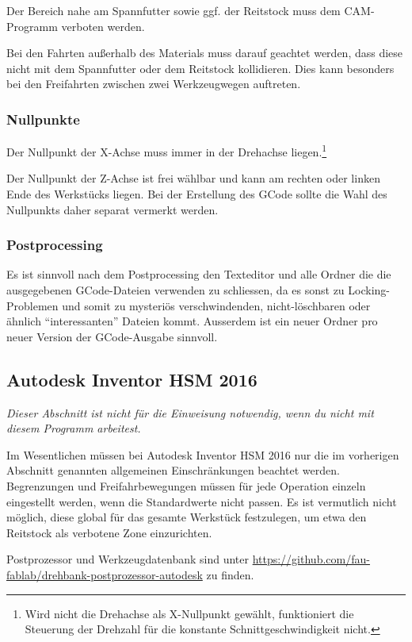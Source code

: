 \documentclass{\basedir/fablab-document}
\begin{document}
Der Bereich nahe am Spannfutter sowie ggf. der Reitstock muss dem CAM-Programm verboten werden.

Bei den Fahrten außerhalb des Materials muss darauf geachtet werden, dass diese nicht mit dem Spannfutter oder dem Reitstock kollidieren. Dies kann besonders bei den Freifahrten zwischen zwei Werkzeugwegen auftreten.

\subsubsection{Nullpunkte} \label{sec:cnc-erstellung.allg.nullpunkte}
Der Nullpunkt der X-Achse muss immer in der Drehachse liegen.\footnote{Wird nicht die Drehachse als X-Nullpunkt gewählt, funktioniert die Steuerung der Drehzahl für die konstante Schnittgeschwindigkeit nicht.}

Der Nullpunkt der Z-Achse ist frei wählbar und kann am rechten oder linken Ende des Werkstücks liegen. Bei der Erstellung des GCode sollte die Wahl des Nullpunkts daher separat vermerkt werden.

\subsubsection{Postprocessing}
Es ist sinnvoll nach dem Postprocessing den Texteditor und alle Ordner die die ausgegebenen
GCode-Dateien verwenden zu schliessen, da es sonst zu Locking-Problemen und
somit zu mysteriös verschwindenden, nicht-löschbaren oder ähnlich
"`interessanten"' Dateien kommt. Ausserdem ist ein neuer Ordner pro neuer
Version der GCode-Ausgabe sinnvoll.

\subsection{Autodesk Inventor HSM 2016}
\emph{Dieser Abschnitt ist nicht für die Einweisung notwendig, wenn du nicht mit diesem Programm arbeitest.}

Im Wesentlichen müssen bei Autodesk Inventor HSM 2016 nur die im vorherigen Abschnitt genannten allgemeinen Einschränkungen beachtet werden.
Begrenzungen und Freifahrbewegungen müssen für jede Operation einzeln eingestellt werden, wenn die Standardwerte nicht passen. Es ist vermutlich nicht möglich, diese global für das gesamte Werkstück festzulegen, um etwa den Reitstock als verbotene Zone einzurichten.

Postprozessor und Werkzeugdatenbank sind unter \url{https://github.com/fau-fablab/drehbank-postprozessor-autodesk} zu finden.
\end{document}

